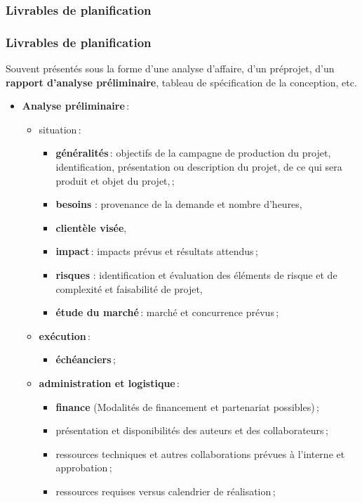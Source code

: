 \begin{frame}[allowframebreaks]
						
					\end{frame}

						\subsubsection{Livrables de planification} 
							\begin{frame}[allowframebreaks]
							\frametitle{Livrables de planification}
                        		Souvent présentés sous la forme d'une analyse d’affaire, d'un préprojet, d'un \textbf{rapport d’analyse préliminaire}, tableau de spécification de la conception, etc.
	
							\begin{itemize}
							\framebreak
							\item \textbf{Analyse préliminaire}\,:
								\begin{itemize}
								\item situation\,:
									\begin{itemize}
									\item \textbf{généralités}\,: objectifs de la campagne de production du projet, identification, présentation ou description du projet, de ce qui sera produit et objet du projet,\,;
									\item \textbf{besoins }: provenance de la demande et nombre d’heures,
									\item \textbf{clientèle visée},
									\item \textbf{impact}\,: impacts prévus et résultats attendus\,;
									\item \textbf{risques }: identification et évaluation des éléments de risque et de complexité et faisabilité de projet,										
									\item \textbf{étude du marché}\,: marché et concurrence prévus\,;								
									\end{itemize}
								\framebreak
								\item \textbf{exécution}\,: 
									\begin{itemize}
									\item \textbf{échéanciers}\,;
									\end{itemize}
								\item \textbf{administration et logistique}\,:
									\begin{itemize}
									\item \textbf{finance} (Modalités de financement et partenariat possibles)\,;						
									\item présentation et disponibilités des auteurs et des collaborateurs\,;
									\item ressources techniques et autres collaborations prévues à l’interne et approbation\,;
									\item ressources requises versus calendrier de réalisation\,;
									\end{itemize}
								\end{itemize}
							\framebreak
							

\end{itemize}
\end{frame}
